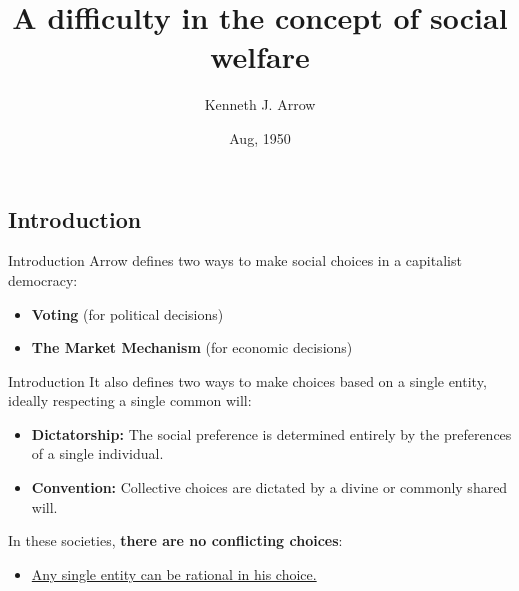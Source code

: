 \documentclass{beamer}
\title[A difficulty in the concept of social welfare]{A difficulty in the concept of social welfare}
\author[Mario Sguario]{Kenneth J. Arrow}
\institute[University of Trento]{Stanford University}
\date[Jun 3, 2026]{Aug, 1950}
\begin{document}
\begin{frame}
    \titlepage
\end{frame}

\subsection{Introduction}
\begin{frame}{Introduction}
 Arrow defines two ways to make social choices in a capitalist democracy:
    \begin{itemize}    
    \item \textbf{Voting} (for political decisions)
    \item \textbf{The Market Mechanism} (for economic decisions)
    \end{itemize}
\end{frame}

\begin{frame}{Introduction}
 It also defines two ways to make choices based on a single entity, ideally respecting a single common will:
    \begin{itemize}
        \item \textbf{Dictatorship:} The social preference is determined entirely by the preferences of a single individual.
        \item \textbf{Convention:} Collective choices are dictated by a divine or commonly shared will.
    \end{itemize}
    \vspace{0.5 cm}
     In these societies, \textbf{there are no conflicting choices}: \\
     \vspace{0.25 cm}
     \begin{itemize}
        \item[$\Rightarrow$] \underline{Any single entity can be rational in his choice.}
    \end{itemize}
\end{frame}
\end{document}
